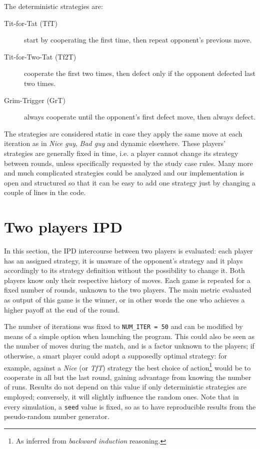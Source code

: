 \documentclass[journal,10pt,twoside]{IEEEtran}
\begin{document}
The deterministic strategies are:
\begin{description}
    \item[Tit-for-Tat (TfT)] start by cooperating the first time, then repeat opponent's previous move.
    \item[Tit-for-Two-Tat (Tf2T)] cooperate the first two times, then defect only if the opponent defected last two times.
    \item[Grim-Trigger (GrT)] always cooperate until the opponent's first defect move, then always defect. 
\end{description}

The strategies are considered static in case they apply the same move at each iteration as in \textit{Nice guy}, \textit{Bad guy} and dynamic elsewhere.
These players' strategies are generally fixed in time, i.e. a player cannot change its strategy between rounds, unless specifically requested by the study case rules.%
Many more and much complicated strategies could be analyzed and our implementation is open and structured so that it can be easy to add one strategy just by changing a couple of lines in the code.

\section{Two players IPD} \label{s:IPD2P}
In this section, the IPD intercourse between two players is evaluated: each player has an assigned strategy, it is unaware of the opponent's strategy and it plays accordingly to its strategy definition without the possibility to change it. Both players know only their respective history of moves. Each game is repeated for a fixed number of rounds, unknown to the two players. The main metric evaluated as output of this game is the winner, or in other words the one who achieves a higher payoff at the end of the round.

The number of iterations was fixed to \texttt{NUM\_ITER = 50} and can be modified by means of a simple option when launching the program.
This could also be seen as the number of moves during the match, and is a factor unknown to the players; if otherwise, a smart player could adopt a supposedly optimal strategy: for example, against a \textit{Nice} (or \textit{TfT}) strategy the best choice of action\footnote{As inferred from \textit{backward induction} reasoning.} would be to cooperate in all but the last round, gaining advantage from knowing the number of runs.
Results do not depend on this value if only deterministic strategies are employed; conversely, it will slightly influence the random ones.
Note that in every simulation, a \texttt{seed} value is fixed, so as to have reproducible results from the pseudo-random number generator.
\end{document}
